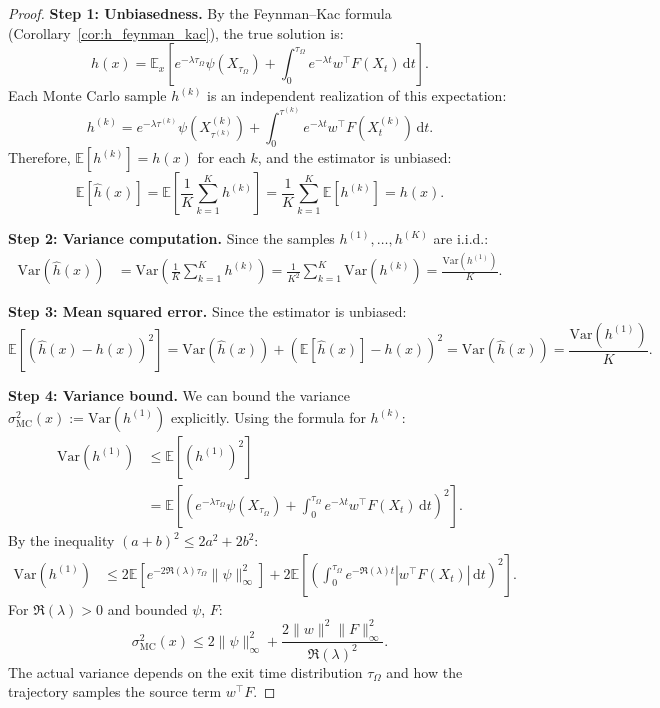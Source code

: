 \documentclass[11pt,a4paper]{article}
\newcommand{\E}{\mathbb{E}}
\newcommand{\Var}{\mathrm{Var}}
\newcommand{\dt}{\,\mathrm{d}t}
\begin{document}
\begin{proof}
\textbf{Step 1: Unbiasedness.}
By the Feynman--Kac formula (Corollary~\ref{cor:h_feynman_kac}), the true solution is:
\begin{equation}
h(x) = \E_x\left[e^{-\lambda \tau_\Omega} \psi(X_{\tau_\Omega}) + \int_0^{\tau_\Omega} e^{-\lambda t} w^\top F(X_t) \dt\right].
\end{equation}
Each Monte Carlo sample $h^{(k)}$ is an independent realization of this expectation:
\begin{equation}
h^{(k)} = e^{-\lambda \tau^{(k)}} \psi(X_{\tau^{(k)}}^{(k)}) + \int_0^{\tau^{(k)}} e^{-\lambda t} w^\top F(X_t^{(k)}) \dt.
\end{equation}
Therefore, $\E[h^{(k)}] = h(x)$ for each $k$, and the estimator is unbiased:
\begin{equation}
\E[\widehat{h}(x)] = \E\left[\frac{1}{K}\sum_{k=1}^K h^{(k)}\right] = \frac{1}{K}\sum_{k=1}^K \E[h^{(k)}] = h(x).
\end{equation}

\textbf{Step 2: Variance computation.}
Since the samples $h^{(1)}, \ldots, h^{(K)}$ are i.i.d.:
\begin{align}
\Var(\widehat{h}(x)) &= \Var\left(\frac{1}{K}\sum_{k=1}^K h^{(k)}\right) = \frac{1}{K^2}\sum_{k=1}^K \Var(h^{(k)}) = \frac{\Var(h^{(1)})}{K}.
\end{align}

\textbf{Step 3: Mean squared error.}
Since the estimator is unbiased:
\begin{equation}
\E[(\widehat{h}(x) - h(x))^2] = \Var(\widehat{h}(x)) + (\E[\widehat{h}(x)] - h(x))^2 = \Var(\widehat{h}(x)) = \frac{\Var(h^{(1)})}{K}.
\end{equation}

\textbf{Step 4: Variance bound.}
We can bound the variance $\sigma_{\mathrm{MC}}^2(x) := \Var(h^{(1)})$ explicitly. Using the formula for $h^{(k)}$:
\begin{align}
\Var(h^{(1)}) &\leq \E[(h^{(1)})^2] \\
&= \E\left[\left(e^{-\lambda \tau_\Omega} \psi(X_{\tau_\Omega}) + \int_0^{\tau_\Omega} e^{-\lambda t} w^\top F(X_t) \dt\right)^2\right].
\end{align}
By the inequality $(a+b)^2 \leq 2a^2 + 2b^2$:
\begin{align}
\Var(h^{(1)}) &\leq 2\E\left[e^{-2\Re(\lambda)\tau_\Omega} \|\psi\|_\infty^2\right] + 2\E\left[\left(\int_0^{\tau_\Omega} e^{-\Re(\lambda) t} |w^\top F(X_t)| \dt\right)^2\right].
\end{align}
For $\Re(\lambda) > 0$ and bounded $\psi$, $F$:
\begin{equation}
\sigma_{\mathrm{MC}}^2(x) \leq 2\|\psi\|_\infty^2 + \frac{2\|w\|^2 \|F\|_\infty^2}{\Re(\lambda)^2}.
\end{equation}
The actual variance depends on the exit time distribution $\tau_\Omega$ and how the trajectory samples the source term $w^\top F$.
\end{proof}
\end{document}
